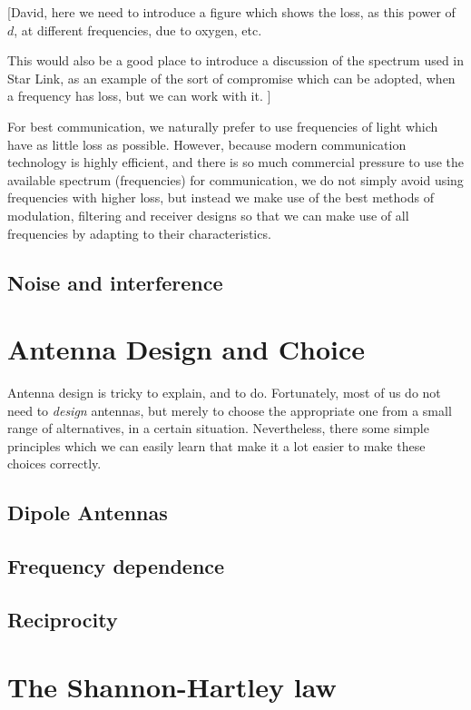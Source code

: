 [David, here we need to introduce a figure which shows the loss, as this power of $d$,
at different frequencies, due to oxygen, etc.

This would also be a good place to introduce a discussion of the spectrum used
in Star Link, as an example of the sort of compromise which can be adopted, when
a frequency has loss, but we can work with it.
]

For best communication, we naturally prefer to use frequencies of light
which have as little loss as possible. However, because modern communication technology is
highly efficient, and there is so much commercial pressure to use the available
spectrum (frequencies) for communication, we do not simply avoid using frequencies
with higher loss, but instead we make use of the best methods of modulation, filtering
and receiver designs so that we can make use of all frequencies by adapting to their
characteristics.

\subsection{Noise and interference}

\section{Antenna Design and Choice}

Antenna design is tricky to explain, and to do. Fortunately,
most of us do not need to {\em design} antennas, but merely to
choose the appropriate one from a small range of alternatives, in
a certain situation. Nevertheless, there some simple principles
which we can easily learn that make it a lot easier to make these
choices correctly.

\subsection{Dipole Antennas}

\subsection{Frequency dependence}

\subsection{Reciprocity}



\section{The Shannon-Hartley law}

